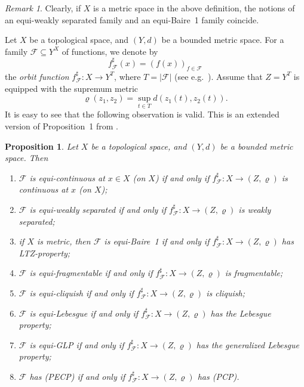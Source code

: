 \documentclass[a4paper]{amsart}
\theoremstyle{plain}
\newtheorem{proposition}[theorem]{Proposition}
\theoremstyle{definition}
\theoremstyle{remark}
\newtheorem{remark}[theorem]{Remark}
\numberwithin{equation}{section}
\begin{document}
    \begin{remark}\label{nowa}
Clearly, if $X$ is a metric space in the above definition, the notions
of an equi-weakly separated family and an equi-Baire~1 family coincide.
    \end{remark}
	
	Let $X$ be a topological space, and $(Y,d)$ be a bounded metric space. For a family $\mathscr F\subseteq Y^X$ of functions, we denote by 
	$$
	f^{\sharp}_{\mathscr F}(x)=(f(x))_{f\in\mathscr F}
	$$
	the {\it orbit function} $f^\sharp_{\mathscr F}\colon X\to Y^{T}$, where $T=|\mathscr F|$ (see e.g.~\cite[Sec.~4]{MR1849204}).
	Assume that $Z=Y^T$ is equipped with the supremum metric 
	$$
	\varrho(z_1,z_2)=\sup\limits_{t\in T}d(z_1(t),z_2(t)).
	$$
It is easy to see that the following observation is valid.
This is an extended version of Proposition~1 from \cite{Kar}.
	\begin{proposition}\label{prop:orbit}
		Let $X$ be a topological space, and $(Y,d)$ be a bounded metric space. Then
		\begin{enumerate}
			\item[(1)] $\mathscr F$ is equi-continuous at $x\in X$ (on $X$) if and only if 
			$f^{\sharp}_{\mathscr F}\colon X\to (Z,\varrho)$ is continuous at  $x$ (on $X$);
				
			\item[(2)] $\mathscr F$ is equi-weakly separated if and only if 
			$f^{\sharp}_{\mathscr F}\colon X\to (Z,\varrho)$ is weakly separated;

            \item[(3)] if $X$ is metric, then  	  $\mathscr F$ is equi-Baire~1 if and only if  
			$f^{\sharp}_{\mathscr F}\colon X\to (Z,\varrho)$ has LTZ-property;

			\item[(4)] $\mathscr F$ is equi-fragmentable if and   only if  
			$f^{\sharp}_{\mathscr F}\colon X\to (Z,\varrho)$ is fragmentable;
			
			\item[(5)] $\mathscr F$ is equi-cliquish if and   only if  
			$f^{\sharp}_{\mathscr F}\colon X\to (Z,\varrho)$ is cliquish;
			
			\item[(6)]	$\mathscr F$ is equi-Lebesgue if and only if  
			$f^{\sharp}_{\mathscr F}\colon X\to (Z,\varrho)$ has the Lebesgue property;
			
			\item[(7)] $\mathscr F$ is equi-GLP if and only if 
			$f^{\sharp}_{\mathscr F}\colon X\to (Z,\varrho)$ has the generalized Lebesgue property;

            \item[(8)] $\mathscr F$ has (PECP) if and   only if  
			$f^{\sharp}_{\mathscr F}\colon X\to (Z,\varrho)$ has (PCP).
		\end{enumerate}	  
	\end{proposition}
\end{document}
